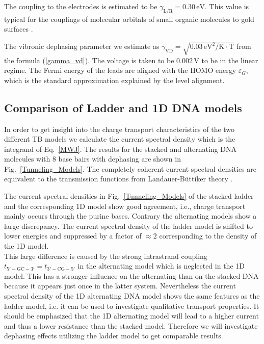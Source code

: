 \documentclass[reprint,superscriptaddress,nofootinbib,amsmath,amssymb,prb,floatfix]{revtex4-1}
\begin{document}
The coupling to the electrodes is estimated to be $\gamma_\text{L/R} = 0.30\,\text{eV}$. This value is typical for the couplings of molecular orbitals of small organic molecules to gold surfaces \cite{Ryndyk13prb}.

The vibronic dephasing parameter we estimate as
$\gamma_\text{VD} = \sqrt{0.03\,\text{eV}^2/\text{K}\cdot\text{T}}$ from the formula
(\ref{gamma_vd}). The voltage is taken to be $0.002\,\text{V}$ to be in the linear regime. The Fermi
energy of the leads are aligned with the HOMO energy $\varepsilon_G$, which is the standard
approximation explained by the level
alignment\cite{kim_intermediate_2016,natallia_v._distance-dependent_2010}.

\subsection{Comparison of Ladder and 1D DNA models}

In order to get insight into the charge transport characteristics of the two different TB models we
calculate the current spectral density which is the integrand of Eq.~\eqref{MWJ}.  The results for
the stacked and alternating DNA molecules with 8 base bairs with dephasing are shown in
Fig.~\ref{Tunneling_Models}. The completely coherent current spectral densities are equivalent to
the transmission functions from Landauer-B\"uttiker theory \cite{Ryndyk2015, penazzi_self_2016}.

The current spectral densities in Fig.~\ref{Tunneling_Models} of the stacked ladder and the
corresponding 1D model show good agreement, i.e., charge transport mainly occurs through the
purine bases.  Contrary the alternating models show a large discrepancy. The current spectral
density of the ladder model is shifted to lower energies and suppressed by a factor of
$\approx 2$ corresponding to the density of the 1D model. \\
This large difference is caused by the strong intrastrand coupling
$t_{5'-\text{GC}-3'} = t_{3'-\text{CG}-5'}$ in the alternating model which is neglected in the 1D
model. This has a stronger influence on the alternating than on the stacked DNA because it appears
just once in the latter system. Nevertheless the current spectral density of the 1D alternating DNA
model shows the same features as the ladder model, i.e. it can be used to investigate qualitative
transport properties. It should be emphasized that the 1D alternating model will lead to a higher
current and thus a lower resistance than the stacked model. Therefore we will investigate dephasing
effects utilizing the ladder model to get comparable results.
\end{document}
